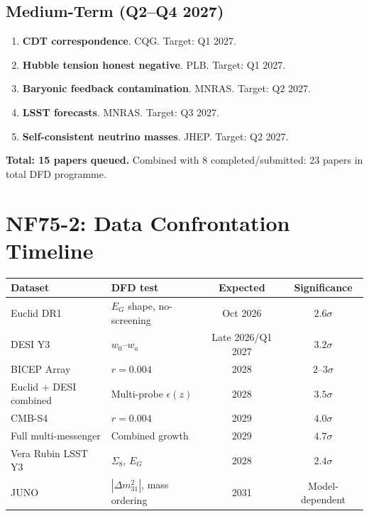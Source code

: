 \documentclass[11pt,a4paper]{article}
\begin{document}
\subsection{Medium-Term (Q2--Q4 2027)}
\begin{enumerate}[resume]
\item \textbf{CDT correspondence}. CQG. Target: Q1 2027.
\item \textbf{Hubble tension honest negative}. PLB. Target: Q1 2027.
\item \textbf{Baryonic feedback contamination}. MNRAS. Target: Q2 2027.
\item \textbf{LSST forecasts}. MNRAS. Target: Q3 2027.
\item \textbf{Self-consistent neutrino masses}. JHEP. Target: Q2 2027.
\end{enumerate}

\textbf{Total: 15 papers queued.} Combined with 8 completed/submitted: 23 papers in total DFD programme.

\section{NF75-2: Data Confrontation Timeline}

\begin{center}
\begin{tabular}{llcc}
\toprule
\textbf{Dataset} & \textbf{DFD test} & \textbf{Expected} & \textbf{Significance} \\
\midrule
Euclid DR1 & $E_G$ shape, no-screening & Oct 2026 & $2.6\sigma$ \\
DESI Y3 & $w_0$--$w_a$ & Late 2026/Q1 2027 & $3.2\sigma$ \\
BICEP Array & $r = 0.004$ & 2028 & $2$--$3\sigma$ \\
Euclid + DESI combined & Multi-probe $\epsilon(z)$ & 2028 & $3.5\sigma$ \\
CMB-S4 & $r = 0.004$ & 2029 & $4.0\sigma$ \\
Full multi-messenger & Combined growth & 2029 & $4.7\sigma$ \\
Vera Rubin LSST Y3 & $\Sigma_8$, $E_G$ & 2028 & $2.4\sigma$ \\
JUNO & $|\Delta m^2_{31}|$, mass ordering & 2031 & Model-dependent \\
\bottomrule
\end{tabular}
\end{center}
\end{document}
